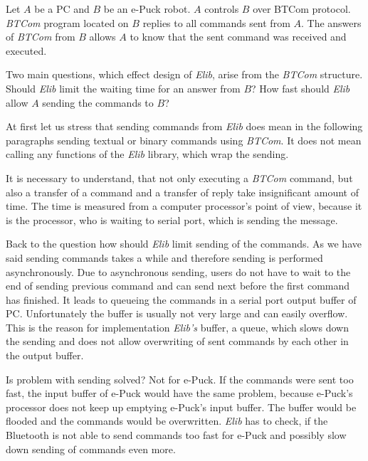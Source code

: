     
  Let $A$ be a PC and $B$ be an e-Puck robot. $A$ controls $B$ over BTCom protocol. {\it BTCom} program located on $B$ 
  replies to all commands sent from $A$.
  The answers of {\it BTCom} from $B$ allows $A$ to know that the sent command was received and
  executed. 
   
  Two main questions, which effect design of {\it Elib}, arise from the {\it BTCom} structure.
  Should {\it Elib} limit the waiting time for an answer from $B$?
  How fast should {\it Elib} allow $A$ sending the commands to $B$?
   
  At first let us stress that sending commands from {\it Elib} does mean in the following paragraphs
  sending textual or binary commands
  using {\it BTCom}. It does not mean calling any functions of the {\it Elib} library, which wrap the sending. 
   
  It is necessary to understand, that not only executing a {\it BTCom} command, 
  but also a transfer of a command and a transfer of reply take insignificant amount of time. 
  The time is measured from a computer processor's point of view, because
  it is the processor, who is waiting to serial port, which is sending the message.
   
  Back to the question how should {\it Elib} limit sending of the commands.
  As we have said sending commands takes a while and therefore sending is performed asynchronously. 
  Due to asynchronous sending, users do not have to wait to the end of sending previous command and
  can send next before the first command has finished.
  It leads to queueing the commands in a serial port output buffer of PC. Unfortunately the buffer is usually not 
  very large and can easily overflow. 
  This is the reason for implementation {\it Elib's} buffer, a queue, which slows down the sending and does not allow
  overwriting of sent commands by each other in the output buffer. 
   
  Is problem with sending solved? Not for e-Puck. If the commands were sent too fast,
  the input buffer of e-Puck would have the same problem, because e-Puck's processor does not keep up emptying e-Puck's
  input buffer. The buffer would be flooded and the commands would be overwritten. 
  {\it Elib} has to check, if the Bluetooth is not able to send commands too fast for e-Puck
  and possibly slow down sending of commands even more.

   
